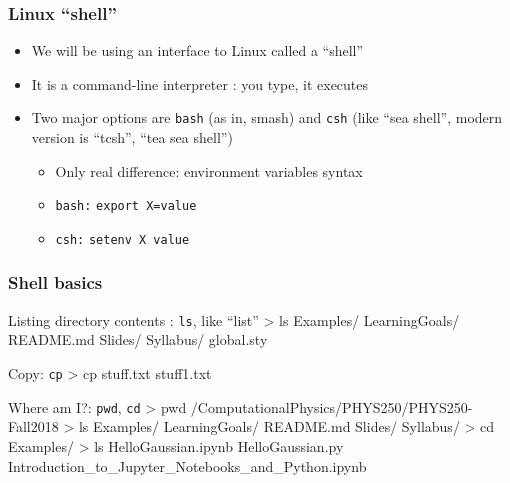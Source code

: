 \documentclass[hyperref={colorlinks=true}]{beamer}
\begin{document}

\begin{frame}%
  \frametitle{Linux ``shell''}
  
  \begin{itemize}
    \item We will be using an interface to Linux called a ``shell''
    \item It is a command-line interpreter : you type, it executes
    \item Two major options are \texttt{bash} (as in, smash) and \texttt{csh} (like ``sea shell'', modern version is ``tcsh'', ``tea sea shell'')
    \begin{itemize}
      \item Only real difference: environment variables syntax
      \item \texttt{bash:} \texttt{export X=value}
      \item \texttt{csh:} \texttt{setenv X value}
    \end{itemize}
  \end{itemize}
  
\end{frame}


\begin{frame}[fragile]
  \frametitle{Shell basics}
  
  \begin{ucbashblock}{Listing directory contents : \texttt{ls}, like ``list''}
> ls
Examples/ LearningGoals/ README.md Slides/ 
Syllabus/ global.sty
  \end{ucbashblock}
  
  \begin{ucbashblock}{Copy: \texttt{cp}}
> cp stuff.txt stuff1.txt
  \end{ucbashblock}
  
  \begin{ucbashblock}{Where am I?: \texttt{pwd}, \texttt{cd}}
> pwd
/ComputationalPhysics/PHYS250/PHYS250-Fall2018
> ls
Examples/ LearningGoals/ README.md Slides/ Syllabus/
> cd Examples/
> ls
HelloGaussian.ipynb
HelloGaussian.py
Introduction_to_Jupyter_Notebooks_and_Python.ipynb
  \end{ucbashblock}  
\end{frame}


\end{document}
